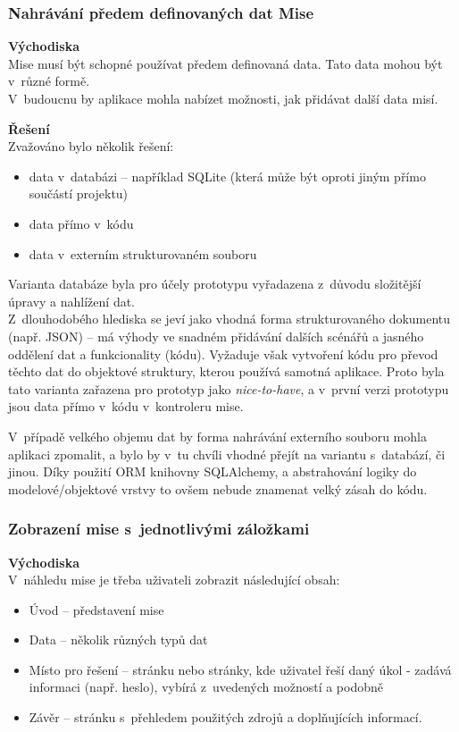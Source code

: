 \subsubsection*{Nahrávání předem definovaných dat Mise}
	\textbf{Východiska}\\
	Mise musí být schopné používat předem definovaná data. Tato data mohou být v~různé formě.\\
	V~budoucnu by aplikace mohla nabízet možnosti, jak přidávat další data misí.
	
	\textbf{Řešení}\\
	Zvažováno bylo několik řešení:
	
	\begin{itemize}
		\item data v~databázi -- například SQLite (která může být oproti jiným přímo součástí projektu)
		\item data přímo v~kódu
		\item data v~externím strukturovaném souboru
	\end{itemize}

	Varianta databáze byla pro účely prototypu vyřadazena z~důvodu složitější úpravy a nahlížení dat. \\
	Z~dlouhodobého hlediska se jeví jako vhodná forma strukturovaného dokumentu (např. JSON) -- má výhody ve snadném přidávání dalších scénářů a jasného oddělení dat a funkcionality (kódu). Vyžaduje však vytvoření kódu pro převod těchto dat do objektové struktury, kterou používá samotná aplikace.
	Proto byla tato varianta zařazena pro prototyp jako \textit{nice-to-have}, a v~první verzi prototypu jsou data přímo v~kódu v~kontroleru mise.

	V~případě velkého objemu dat by forma nahrávání externího souboru mohla aplikaci zpomalit, a bylo by v~tu chvíli vhodné přejít na variantu s~databází, či jinou. Díky použití ORM knihovny SQLAlchemy, a abstrahování logiky do modelové/objektové vrstvy to ovšem nebude znamenat velký zásah do kódu. 

\subsubsection*{Zobrazení mise s~jednotlivými záložkami}
	\textbf{Východiska}\\
	V~náhledu mise je třeba uživateli zobrazit následující obsah:
	
	\begin{itemize}
		\item Úvod -- představení mise
		\item Data -- několik různých typů dat
		\item Místo pro řešení -- stránku nebo stránky, kde uživatel řeší daný úkol - zadává informaci (např. heslo), vybírá z~uvedených možností a podobně
		\item Závěr -- stránku s~přehledem použitých zdrojů a doplňujících informací. 
	\end{itemize}	

